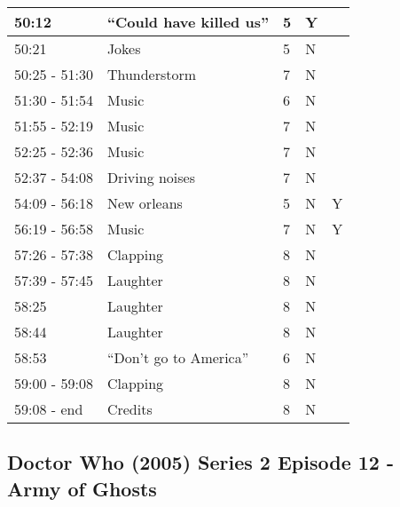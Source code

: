 \begin{longtable}{| p{70pt} | p{130pt} | p{45pt} | p{57pt} | p{60pt}|}
50:12 & ``Could have killed us'' & 5 & Y&\\\hline
50:21 & Jokes & 5 & N&\\\hline
50:25 - 51:30 & Thunderstorm & 7 & N&\\\hline
51:30 - 51:54 & Music & 6 & N&\\\hline
51:55 - 52:19 & Music & 7 & N&\\\hline
52:25 - 52:36 & Music & 7 & N&\\\hline
52:37 - 54:08 & Driving noises & 7 & N&\\\hline
54:09 - 56:18 & New orleans & 5 & N&Y\\\hline
56:19 - 56:58 & Music & 7 & N&Y\\\hline
57:26 - 57:38 & Clapping & 8 & N&\\\hline
57:39 - 57:45 & Laughter & 8 & N&\\\hline
58:25 & Laughter & 8 & N&\\\hline
58:44 & Laughter & 8 & N&\\\hline
58:53 & ``Don't go to America'' & 6 & N&\\\hline
59:00 - 59:08 & Clapping & 8 & N&\\\hline
59:08 - end & Credits & 8 & N &\\\hline
\end{longtable}

\newpage
\subsection{Doctor Who (2005) Series 2 Episode 12 -  Army of Ghosts}

